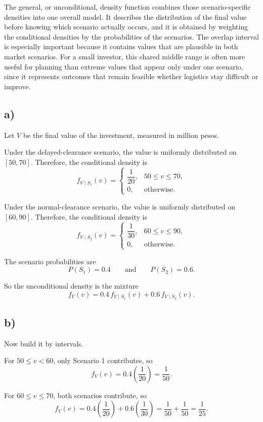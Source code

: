 	The general, or unconditional, density function combines those scenario-specific densities into one overall model. It describes the distribution of the final value before knowing which scenario actually occurs, and it is obtained by weighting the conditional densities by the probabilities of the scenarios. The overlap interval is especially important because it contains values that are plausible in both market scenarios. For a small investor, this shared middle range is often more useful for planning than extreme values that appear only under one scenario, since it represents outcomes that remain feasible whether logistics stay difficult or improve.
	
	\subsection*{a)}
	Let $V$ be the final value of the investment, measured in million pesos.
	
	Under the delayed-clearance scenario, the value is uniformly distributed on $[50,70]$. Therefore, the conditional density is
	\[
	f_{V\mid S_1}(v)=
	\begin{cases}
		\dfrac{1}{20}, & 50\le v\le 70,\\[4pt]
		0, & \text{otherwise.}
	\end{cases}
	\]
	
	Under the normal-clearance scenario, the value is uniformly distributed on $[60,90]$. Therefore, the conditional density is
	\[
	f_{V\mid S_2}(v)=
	\begin{cases}
		\dfrac{1}{30}, & 60\le v\le 90,\\[4pt]
		0, & \text{otherwise.}
	\end{cases}
	\]
	
	The scenario probabilities are
	\[
	P(S_1)=0.4
	\qquad \text{and} \qquad
	P(S_2)=0.6.
	\]
	
	So the unconditional density is the mixture
	\[
	f_V(v)=0.4\,f_{V\mid S_1}(v)+0.6\,f_{V\mid S_2}(v).
	\]
	
	\subsection*{b)}
	Now build it by intervals.
	
	For $50\le v<60$, only Scenario 1 contributes, so
	\[
	f_V(v)=0.4\left(\frac{1}{20}\right)=\frac{1}{50}.
	\]
	
	For $60\le v\le 70$, both scenarios contribute, so
	\[
	f_V(v)=0.4\left(\frac{1}{20}\right)+0.6\left(\frac{1}{30}\right)
	=\frac{1}{50}+\frac{1}{50}
	=\frac{1}{25}.
	\]
	
